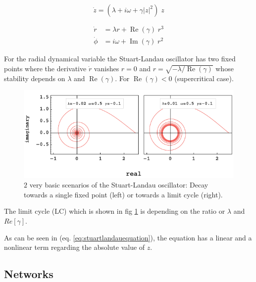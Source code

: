 \begin{equation}	
	\dot{z} = (\lambda +  i \omega + \gamma |z|^2 ) \; z
	\label{eq:stuartlandauequation}		
\end{equation}

\begin{equation}
	\begin{split}
	\dot{r} & = \lambda r + \operatorname{Re} (\gamma) \; r^{3} \\
	\dot{\phi} &= i \omega + \operatorname{Im}(\gamma) \; r^{2} 
	\end{split}
	\label{eq:stuartlandauequation_polar}
\end{equation}

	For the radial dynamical variable the Stuart-Landau oscillator has two fixed points where the derivative $\dot{r}$ vanishes $r = 0$ and $r = \sqrt{-\lambda /\operatorname{Re}(\gamma)}$ whose stability depends on $\lambda$ and $\operatorname{Re}(\gamma)$. For $\operatorname{Re}(\gamma) < 0 $ (supercritical case).


\begin{figure}
	\centering
	\includegraphics[width=0.99\linewidth]{pics/stuart_landau_complex_Focus_LC}
	\caption{$2$ very basic scenarios of the Stuart-Landau oscillator: Decay towards a single fixed point (left) or towards a limit cycle (right).}
	\label{fig:stuart_spiral}
\end{figure}


The limit cycle (LC) which is shown in fig \ref{fig:stuart_spiral} is depending on the ratio or $\lambda$ and $Re \left[\gamma \right]$.


As can be seen in (eq. \ref{eq:stuartlandauequation}), the equation has a linear and a nonlinear term regarding the absolute value of $z$.

\subsection{Networks}

